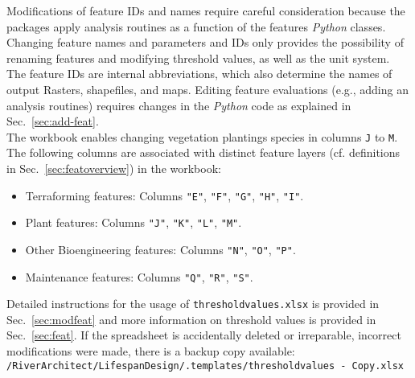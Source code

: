 Modifications of feature IDs and names require careful consideration because the packages apply analysis routines as a function of the features \textit{Python} classes. Changing feature names and parameters and IDs only provides the possibility of renaming features and modifying threshold values, as well as the unit system. The feature IDs are internal abbreviations, which also determine the names of output Rasters, shapefiles, and maps. Editing feature evaluations (e.g., adding an analysis routines) requires changes in the \textit{Python} code as explained in Sec.~\ref{sec:add-feat}.\\
The workbook enables changing vegetation plantings species in columns \texttt{J} to \texttt{M}. The following columns are associated with distinct feature layers (cf. definitions in Sec.~\ref{sec:featoverview}) in the workbook:
\begin{itemize}
	\item Terraforming features: Columns \texttt{"E"}, \texttt{"F"}, \texttt{"G"}, \texttt{"H"}, \texttt{"I"}.
	\item Plant features: Columns \texttt{"J"}, \texttt{"K"}, \texttt{"L"}, \texttt{"M"}.
	\item Other Bioengineering features: Columns \texttt{"N"}, \texttt{"O"}, \texttt{"P"}.
	\item Maintenance features: Columns \texttt{"Q"}, \texttt{"R"}, \texttt{"S"}.
\end{itemize}

Detailed instructions for the usage of \texttt{threshold{\myUnderscore}values.xlsx} is provided in Sec.~\ref{sec:modfeat} and more information on threshold values is provided in Sec.~\ref{sec:feat}. If the spreadsheet is accidentally deleted or irreparable, incorrect modifications were made, there is a backup copy available:\\
\texttt{/RiverArchitect/LifespanDesign/.templates/threshold{\myUnderscore}values - Copy.xlsx}

